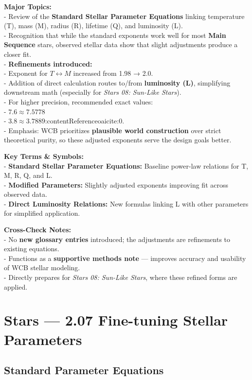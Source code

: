 \documentclass[
  letterpaper,
]{book}
\begin{document}
\textbf{Major Topics:}\\
- Review of the \textbf{Standard Stellar Parameter Equations} linking
temperature (T), mass (M), radius (R), lifetime (Q), and luminosity
(L).\\
- Recognition that while the standard exponents work well for most
\textbf{Main Sequence} stars, observed stellar data show that slight
adjustments produce a closer fit.\\
- \textbf{Refinements introduced:}\\
- Exponent for \(T ↔︎ M\) increased from 1.98 → 2.0.\\
- Addition of direct calculation routes to/from \textbf{luminosity (L)},
simplifying downstream math (especially for \emph{Stars 08: Sun-Like
Stars}).\\
- For higher precision, recommended exact values:\\
- \(7.6 ≈ 7.5778\)\\
- \(3.8 ≈ 3.7889\):contentReference{oaicite:0}.\\
- Emphasis: WCB prioritizes \textbf{plausible world construction} over
strict theoretical purity, so these adjusted exponents serve the design
goals better.

\textbf{Key Terms \& Symbols:}\\
- \textbf{Standard Stellar Parameter Equations:} Baseline power-law
relations for T, M, R, Q, and L.\\
- \textbf{Modified Parameters:} Slightly adjusted exponents improving
fit across observed data.\\
- \textbf{Direct Luminosity Relations:} New formulas linking L with
other parameters for simplified application.

\textbf{Cross-Check Notes:}\\
- No \textbf{new glossary entries} introduced; the adjustments are
refinements to existing equations.\\
- Functions as a \textbf{supportive methods note} --- improves accuracy
and usability of WCB stellar modeling.\\
- Directly prepares for \emph{Stars 08: Sun-Like Stars}, where these
refined forms are applied.

\chapter{Stars --- 2.07 Fine-tuning Stellar
Parameters}\label{stars-2.07-fine-tuning-stellar-parameters}

\section{Standard Parameter
Equations}\label{standard-parameter-equations}
\end{document}
